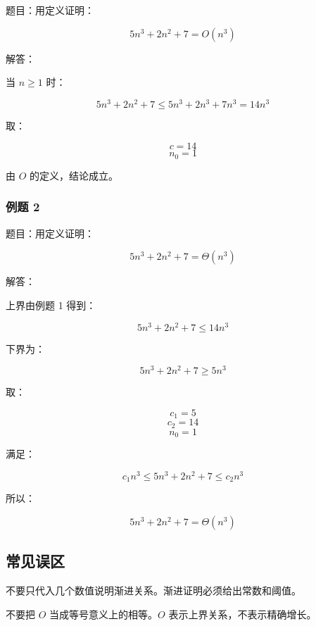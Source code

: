 \documentclass[UTF8,zihao=-4]{ctexart}
\begin{document}
题目：用定义证明：

\[5n^{3} + 2n^{2} + 7 = O(n^{3})\]

解答：

当 $n \ge 1$ 时：

\[5n^{3} + 2n^{2} + 7 \le  5n^{3} + 2n^{3} + 7n^{3} = 14n^{3}\]

取：

\[c = 14\]
\[n_{0} = 1\]

由 $O$ 的定义，结论成立。

\subsubsection*{例题 2}

题目：用定义证明：

\[5n^{3} + 2n^{2} + 7 = \Theta(n^{3})\]

解答：

上界由例题 1 得到：

\[5n^{3} + 2n^{2} + 7 \le  14n^{3}\]

下界为：

\[5n^{3} + 2n^{2} + 7 \ge  5n^{3}\]

取：

\[c_{1} = 5\]
\[c_{2} = 14\]
\[n_{0} = 1\]

满足：

\[c_{1} n^{3} \le  5n^{3} + 2n^{2} + 7 \le  c_{2} n^{3}\]

所以：

\[5n^{3} + 2n^{2} + 7 = \Theta(n^{3})\]

\subsection*{常见误区}

不要只代入几个数值说明渐进关系。渐进证明必须给出常数和阈值。

不要把 $O$ 当成等号意义上的相等。$O$ 表示上界关系，不表示精确增长。
\end{document}

